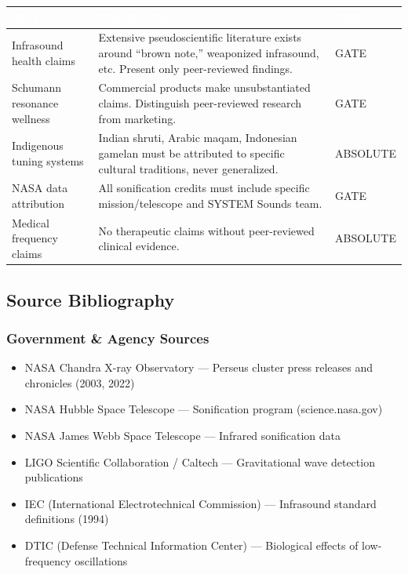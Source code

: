 \documentclass[11pt,letterpaper]{article}
\newcommand{\tableheader}[1]{\textbf{\sffamily\textcolor{white}{#1}}}
\begin{document}
\begin{center}
\begin{tabularx}{\textwidth}{L{3.5cm}XC{2cm}}
\toprule
{}
\tableheader{Area} & \tableheader{Consideration} & \tableheader{Action} \\
\midrule
Infrasound health claims & Extensive pseudoscientific literature exists around ``brown note,'' weaponized infrasound, etc. Present only peer-reviewed findings. & GATE \\
Schumann resonance wellness & Commercial products make unsubstantiated claims. Distinguish peer-reviewed research from marketing. & GATE \\
Indigenous tuning systems & Indian shruti, Arabic maqam, Indonesian gamelan must be attributed to specific cultural traditions, never generalized. & ABSOLUTE \\
NASA data attribution & All sonification credits must include specific mission/telescope and SYSTEM Sounds team. & GATE \\
Medical frequency claims & No therapeutic claims without peer-reviewed clinical evidence. & ABSOLUTE \\
\bottomrule
\end{tabularx}
\end{center}

\subsection{Source Bibliography}

\subsubsection{Government \& Agency Sources}
\begin{itemize}[leftmargin=2em]
\item NASA Chandra X-ray Observatory --- Perseus cluster press releases and chronicles (2003, 2022)
\item NASA Hubble Space Telescope --- Sonification program (science.nasa.gov)
\item NASA James Webb Space Telescope --- Infrared sonification data
\item LIGO Scientific Collaboration / Caltech --- Gravitational wave detection publications
\item IEC (International Electrotechnical Commission) --- Infrasound standard definitions (1994)
\item DTIC (Defense Technical Information Center) --- Biological effects of low-frequency oscillations
\end{itemize}
\end{document}
